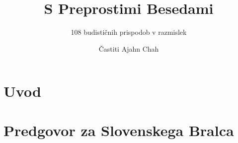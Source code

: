 \documentclass[11pt,twoside,final]{memoir}
\title{S Preprostimi Besedami}
\subtitle{108 budističnih prispodob v razmislek}
\author{Častiti Ajahn Chah}
\date{}
\begin{document}
\emptysheet


\frontmatter*


\cleartoverso
\thispagestyle{empty}



\cleartorecto
\thispagestyle{empty}



\cleartoverso
\thispagestyle{empty}



\cleartorecto
\thispagestyle{empty}





\cleartorecto
\tableofcontents*



\chapter{Uvod}



\chapter{Predgovor za Slovenskega Bralca}

\end{document}

